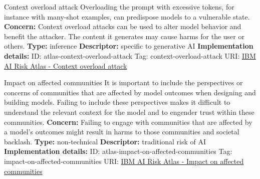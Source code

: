 \documentclass[a4paper,12pt]{article}
\begin{document}
\begin{definitionbox}{Context overload attack}
Overloading the prompt with excessive tokens, for instance with many-shot examples, can predispose models to a vulnerable state.\newline\newline
\textbf{Concern: }Context overload attacks can be used to alter model behavior and benefit the attacker. The content it generates may cause harms for the user or others.\newline\newline
\textbf{Type: }inference\newline
\textbf{Descriptor: }specific to generative AI \newline\newline
\textbf{Implementation details: } \newline
ID: atlas-context-overload-attack \newline
Tag: context-overload-attack \newline
URI:  \href{https://www.ibm.com/docs/en/watsonx/saas?topic=SSYOK8/wsj/ai-risk-atlas/context-overload-attack.html}{IBM AI Risk Atlas - Context overload attack}\newline
\end{definitionbox}
\begin{definitionbox}{Impact on affected communities}
It is important to include the perspectives or concerns of communities that are affected by model outcomes when designing and building models. Failing to include these perspectives makes it difficult to understand the relevant context for the model and to engender trust within these communities.\newline\newline
\textbf{Concern: }Failing to engage with communities that are affected by a model's outcomes might result in harms to those communities and societal backlash.\newline\newline
\textbf{Type: }non-technical\newline
\textbf{Descriptor: }traditional risk of AI \newline\newline
\textbf{Implementation details: } \newline
ID: atlas-impact-on-affected-communities \newline
Tag: impact-on-affected-communities \newline
URI:  \href{https://www.ibm.com/docs/en/watsonx/saas?topic=SSYOK8/wsj/ai-risk-atlas/impact-on-affected-communities.html}{IBM AI Risk Atlas - Impact on affected communities}\newline
\end{definitionbox}
\end{document}
